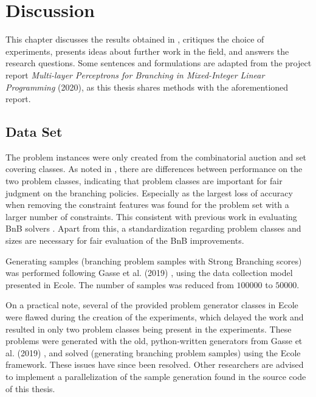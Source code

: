 \chapter{Discussion}\label{cha:discussion}

This chapter discusses the results obtained in , critiques the choice of experiments, presents ideas about further work in the field, and answers the research questions. Some sentences and formulations are adapted from the project report \textit{Multi-layer Perceptrons for Branching in Mixed-Integer Linear Programming} (2020), as this thesis shares methods with the aforementioned report. 
 

\section{Data Set}\label{sec:dis_data}

The problem instances were only created from the combinatorial auction and set covering classes. As noted in , there are differences between performance on the two problem classes, indicating that problem classes are important for fair judgment on the branching policies. Especially as the largest loss of accuracy when removing the constraint features was found for the problem set with a larger number of constraints. This consistent with previous work in evaluating \gls{BnB} solvers \cite{anand2017comparative}. Apart from this, a standardization regarding problem classes and sizes are necessary for fair evaluation of the \gls{BnB} improvements.

Generating samples (branching problem samples with Strong Branching scores) was performed following Gasse et al. (2019) \cite{gasse2019exact}, using the data collection model presented in \gls{Ecole}. The number of samples was reduced from $100000$ to $50000$. 

On a practical note, several of the provided problem generator classes in \gls{Ecole} were flawed during the creation of the experiments, which delayed the work and resulted in only two problem classes being present in the experiments. These problems were generated with the old, python-written generators from Gasse et al. (2019) \cite{gasse2019exact}, and solved (generating branching problem samples) using the \gls{Ecole} framework. These issues have since been resolved. Other researchers are advised to implement a parallelization of the sample generation found in the source code of this thesis. 

